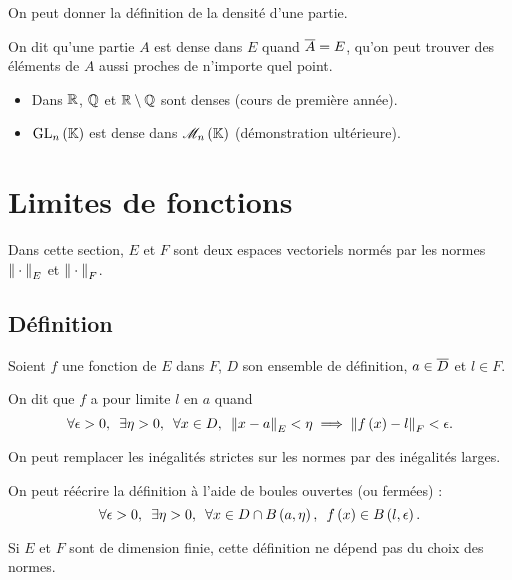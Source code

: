 On peut donner la définition de la densité d'une partie.

\begin{defi}
On dit qu'une partie \(A\) est dense dans \(E\) quand \(\overline{A}=E\), \cad qu'on peut trouver des éléments de \(A\) aussi proches de n'importe quel point.
\end{defi}

\begin{ex}
\begin{itemize}
    \item Dans \(\mathbb{R}\), \(\mathbb{Q}\) et \(\mathbb{R}\setminus\mathbb{Q}\) sont denses (\cf cours de première année). \\
    \item \(\GL{n}\) est dense dans \(\M{n}\) (démonstration ultérieure).
\end{itemize}
\end{ex}

\section{Limites de fonctions}

Dans cette section, \(E\) et \(F\) sont deux espaces vectoriels normés par les normes \(\norme{}_E\) et \(\norme{}_F\).

\subsection{Définition}

\begin{defi}
Soient \(f\) une fonction de \(E\) dans \(F\), \(D\) son ensemble de définition, \(a\in\overline{D}\) et \(l\in F\).

On dit que \(f\) a pour limite \(l\) en \(a\) quand \[\quantifs{\forall\epsilon>0;\exists\eta>0;\forall x\in D}\norme{x-a}_E<\eta\imp\norme{f\paren{x}-l}_F<\epsilon.\]
\end{defi}

\begin{rem}
On peut remplacer les inégalités strictes sur les normes par des inégalités larges.

On peut réécrire la définition à l'aide de boules ouvertes (ou fermées) : \[\quantifs{\forall\epsilon>0;\exists\eta>0;\forall x\in D\inter\bouleo{a}{\eta}}f\paren{x}\in\bouleo{l}{\epsilon}.\]

Si \(E\) et \(F\) sont de dimension finie, cette définition ne dépend pas du choix des normes.
\end{rem}

